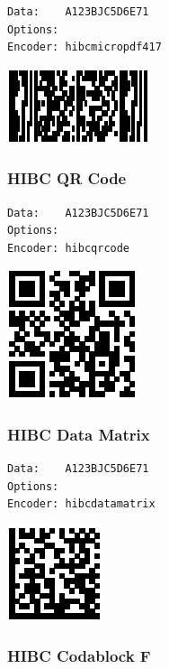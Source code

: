 \begin{verbatim}
Data:    A123BJC5D6E71
Options: 
Encoder: hibcmicropdf417
\end{verbatim}

\includegraphics{images/hibcmicropdf417-1.eps}

\hypertarget{hibc-qr-code}{%
\subsubsection{HIBC QR Code}\label{hibc-qr-code}}

\begin{verbatim}
Data:    A123BJC5D6E71
Options: 
Encoder: hibcqrcode
\end{verbatim}

\includegraphics{images/hibcqrcode-1.eps}

\hypertarget{hibc-data-matrix}{%
\subsubsection{HIBC Data Matrix}\label{hibc-data-matrix}}

\begin{verbatim}
Data:    A123BJC5D6E71
Options: 
Encoder: hibcdatamatrix
\end{verbatim}

\includegraphics{images/hibcdatamatrix-1.eps}

\hypertarget{hibc-codablock-f}{%
\subsubsection{HIBC Codablock F}\label{hibc-codablock-f}}

